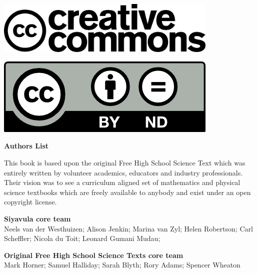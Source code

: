 \vspace*{4in}

\begin{center}
\begin{minipage}{0.6\textwidth}
\includegraphics[width=0.8\textwidth]{title_images/cc2.png}
\end{minipage}
\begin{minipage}{0.3\textwidth}
\includegraphics[width=0.8\textwidth]{title_images/cc1.png}
\end{minipage}
\end{center}

\newpage
\thispagestyle{empty}


\begin{flushleft} \textbf{\LARGE Authors List} \end{flushleft}

{This book is based upon the original Free High School Science Text which was entirely written by
volunteer academics, educators and industry professionals. Their vision was to see a curriculum aligned
set of mathematics and physical science textbooks which are freely available to anybody and exist
under an open copyright license.} \par

\textbf{\large Siyavula core team} \\

Neels van der Westhuizen; Alison Jenkin; Marina van Zyl; Helen Robertson; Carl Scheffler; Nicola du Toit; Leonard Gumani Mudau; \par

\textbf{\large Original Free High School Science Texts core team}\\

Mark Horner; Samuel Halliday; Sarah Blyth; Rory Adams; Spencer Wheaton \par 


